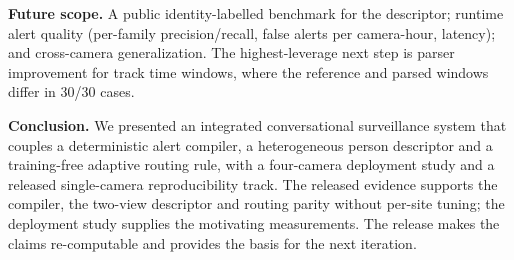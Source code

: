 ﻿\documentclass[conference]{IEEEtran}
\theoremstyle{plain}
\begin{document}
\textbf{Future scope.} A public identity-labelled benchmark for the descriptor; runtime alert quality (per-family precision/recall, false alerts per camera-hour, latency); and cross-camera generalization. The highest-leverage next step is parser improvement for track time windows, where the reference and parsed windows differ in 30/30 cases.

\textbf{Conclusion.} We presented an integrated conversational surveillance system that couples a deterministic alert compiler, a heterogeneous person descriptor and a training-free adaptive routing rule, with a four-camera deployment study and a released single-camera reproducibility track. The released evidence supports the compiler, the two-view descriptor and routing parity without per-site tuning; the deployment study supplies the motivating measurements. The release makes the claims re-computable and provides the basis for the next iteration.



\end{document}
